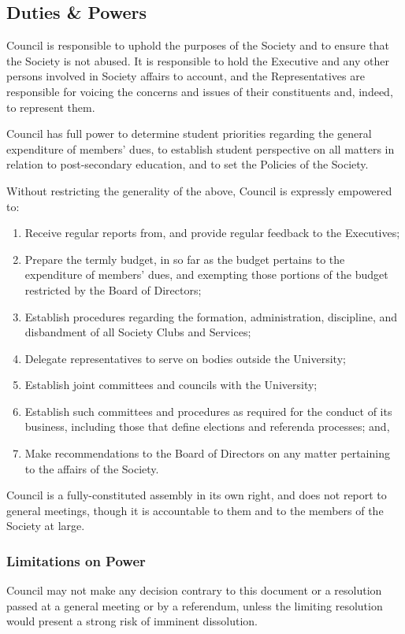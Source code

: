 \subsection{Duties \& Powers}
Council is responsible to uphold the purposes of the Society and to
ensure that the Society is not abused. It is responsible to hold the Executive
and any other persons involved in Society affairs to account, and the
Representatives are responsible for voicing the concerns and issues of their
constituents and, indeed, to represent them. 

Council has full power to determine student priorities regarding the
general expenditure of members’ dues, to establish student perspective on all
matters in relation to post-secondary education, and to set the Policies of the
Society.

Without restricting the generality of the above, Council is expressly
empowered to:
\begin{enumerate}
    \item Receive regular reports from, and provide regular feedback to the
        Executives;
    \item Prepare the termly budget, in so far as the budget pertains to the 
        expenditure of members’ dues, and
        exempting those portions of the budget restricted by the Board of 
        Directors;
    \item Establish procedures regarding the formation, administration,
        discipline, and disbandment of all Society Clubs and Services;
    \item Delegate representatives to serve on bodies outside the University;
    \item Establish joint committees and councils with the University;
    \item Establish such committees and procedures as required for the conduct
        of its business, including those that define elections and referenda
        processes; and,
    \item Make recommendations to the Board of Directors on any matter
        pertaining to the affairs of the Society.
\end{enumerate}

Council is a fully-constituted assembly in its own right,
and does not report to general meetings, though it is accountable to them and
to the members of the Society at large.

\subsubsection{Limitations on Power}
Council may not make any decision contrary to this document or a
resolution passed at a general meeting or by a referendum, unless the limiting
resolution would present a strong risk of imminent dissolution.

